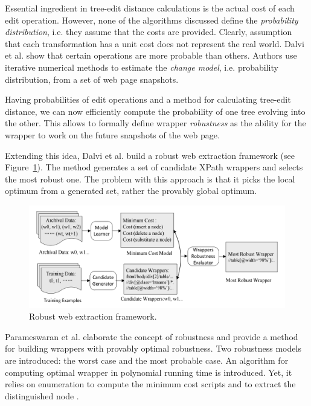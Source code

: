 Essential ingredient in tree-edit distance calculations is the actual cost of each edit operation. However, none of the algorithms discussed define the \emph{probability distribution}, i.e. they assume that the costs are provided. Clearly, assumption that each transformation has a unit cost does not represent the real world. Dalvi et al. \cite{dalvi2009a} show that certain operations are more probable than others. Authors use iterative numerical methods to estimate the \emph{change model}, i.e. probability distribution, from a set of web page snapshots.

Having probabilities of edit operations and a method for calculating tree-edit distance, we can now efficiently compute the probability of one tree evolving into the other. This allows to formally define wrapper \emph{robustness} as the ability for the wrapper to work on the future snapshots of the web page. 

Extending this idea, Dalvi et al. \cite{dalvi2009a} build a robust web extraction framework (see Figure~\ref{fig:web-extraction-framework}).  The method generates a set of candidate XPath wrappers and selects the most robust one. The problem with this approach is that it picks the local optimum from a generated set, rather the provably global optimum.

\begin{figure}[h]
	\centering
	\includegraphics[width=\linewidth]{figures/robust-web-extraction-framework}
	\caption{Robust web extraction framework.}
	\label{fig:web-extraction-framework}
\end{figure}

Parameswaran et al. \cite{DBLP:journals/pvldb/ParameswaranDGR11} elaborate the concept of robustness and provide a method for building wrappers with provably optimal robustness. Two robustness models are introduced: the worst case and the most probable case. An algorithm for computing optimal wrapper in polynomial running time is introduced. Yet, it relies on enumeration to compute the minimum cost scripts and to extract the distinguished node \cite{DBLP:conf/wism/LiuWYL12}.

